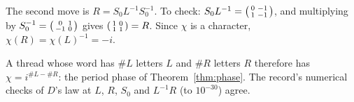 The second move is $R=S_0L^{-1}S_0^{-1}$. To check:
$S_0L^{-1}=\begin{psmallmatrix}0&-1\\1&-1\end{psmallmatrix}$, and multiplying by $S_0^{-1}=\begin{psmallmatrix}0&1\\-1&0\end{psmallmatrix}$
gives $\begin{psmallmatrix}1&0\\1&1\end{psmallmatrix}=R$. Since $\chi$ is a character, $\chi(R)=\chi(L)^{-1}=-i$.

A thread whose word has $\#L$ letters $L$ and $\#R$ letters $R$ therefore has $\chi=i^{\#L-\#R}$: the period phase of
Theorem~\ref{thm:phase}. The record's numerical checks of $D$'s law at $L$, $R$, $S_0$ and $L^{-1}R$ (to $10^{-30}$)
agree.
